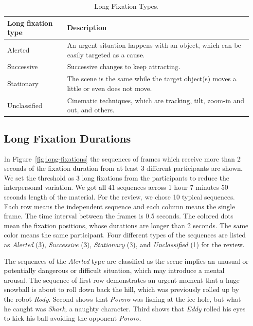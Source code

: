 \documentclass[10pt,letterpaper]{article}
\begin{document}
\begin{table}[!ht]
\begin{center} 
\caption{Long Fixation Types.} 
\label{tab:long-fixation-types} 
\vskip 0.12in
\begin{tabular}{ll} 
\hline
Long fixation type    &  Description \\
\hline
Alerted         &   An urgent situation happens with an object, 
                      which can be easily targeted as a cause. \\
Successive      &   Successive changes to keep attracting. \\
Stationary      &   The scene is the same while the target object(s)
                      moves a little or even does not move. \\
Unclassified    &   Cinematic techniques, which are tracking, tilt, 
                      zoom-in and out, and others. \\
\hline
\end{tabular} 
\end{center} 
\end{table}

\subsection{Long Fixation Durations}
\label{subsec:Long-Fixation-Durations}

In Figure~\ref{fig:long-fixations} the sequences of frames which receive more than 2 seconds of the fixation duration from at least 3 different participants are shown. We set the threshold as 3 long fixations from the participants to reduce the interpersonal variation. We got all 41 sequences across 1 hour 7 minutes 50 seconds length of the material. For the review, we chose 10 typical sequences. Each row means the independent sequence and each column means the single frame. The time interval between the frames is 0.5 seconds. The colored dots mean the fixation positions, whose durations are longer than 2 seconds. The same color means the same participant. Four different types of the sequences are listed as \textit{Alerted} (3), \textit{Successive} (3), \textit{Stationary} (3), and \textit{Unclassified} (1) for the review.

The sequences of the \textit{Alerted} type are classified as the scene implies an unusual or potentially dangerous or difficult situation, which may introduce a mental arousal. The sequence of first row demonstrates an urgent moment that a huge snowball is about to roll down back the hill, which was previously rolled up by the robot \textit{Rody}. Second shows that \textit{Pororo} was fishing at the ice hole, but what he caught was \textit{Shark}, a naughty character. Third shows that \textit{Eddy} rolled his eyes to kick his ball avoiding the opponent \textit{Pororo}.
\end{document}

